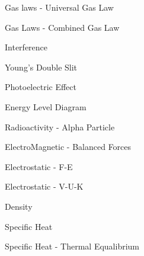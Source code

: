 \documentclass[10pt]{examdesign}
\begin{document}
\begin{multiplechoice}
\begin{question}
	\end{question}
	\begin{question}
		Gas laws - Universal Gas Law
	
	\end{question}
	\begin{question}
	Gas Laws - Combined Gas Law
	\end{question}
	\begin{question}
		Interference
	
	\end{question}

	\begin{question}
		Young's Double Slit
	
\end{question}

	\begin{question}
		Photoelectric Effect
	
\end{question}

	\begin{question}
		Energy Level Diagram
	
\end{question}
	
	\begin{question}
		Radioactivity - Alpha Particle
\end{question}

	\begin{question}
		ElectroMagnetic - Balanced Forces
	
\end{question}

	\begin{question}
		Electrostatic - F-E
	
\end{question}

	\begin{question}
		Electrostatic - V-U-K
	
\end{question}

	\begin{question}
		Density
	
\end{question}

	\begin{question}
		Specific Heat
	
\end{question}

	\begin{question}
	Specific Heat - Thermal Equalibrium
\end{question}


\end{multiplechoice}
\end{document}
